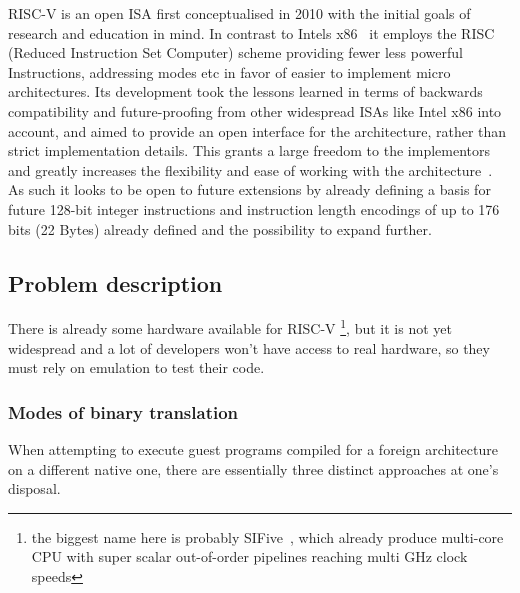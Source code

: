RISC-V is an open ISA first conceptualised in 2010 with the initial goals of research and education in mind.
In contrast to Intels x86~\cite{intel2017man} it employs the RISC (Reduced Instruction Set Computer) scheme providing fewer less powerful Instructions, addressing modes etc in favor of easier to implement micro architectures.
Its development took the lessons learned in terms of backwards compatibility and future-proofing from other widespread ISAs like Intel x86 into account, and aimed to provide an open interface for the architecture, rather than strict implementation details.
This grants a large freedom to the implementors and greatly increases the flexibility and ease of working with the architecture~\cite[S. 1f]{riscvspec}.
As such it looks to be open to future extensions by already defining a basis for future 128-bit integer instructions and instruction length encodings of up to 176 bits (22 Bytes) already defined and the possibility to expand further.


\subsection{Problem description}
There is already some hardware available for RISC-V \footnote{the biggest name here is probably SIFive~\cite{sifive}, which already produce multi-core CPU with super scalar out-of-order pipelines reaching multi GHz clock speeds}, but it is not yet widespread and a lot of developers won't have access to real hardware, so they must rely on emulation to test their code.

\subsubsection{Modes of binary translation}
When attempting to execute guest programs compiled for a foreign architecture on a different native one, there are essentially three distinct approaches at one's disposal.

